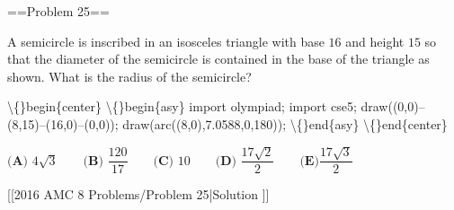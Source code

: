 \documentclass{article}
\begin{document}
\begin{enumerate}[label=\arabic*., itemsep=0.5em]
==Problem 25== 

A semicircle is inscribed in an isosceles triangle with base \(16\) and height \(15\) so that the diameter of the semicircle is contained in the base of the triangle as shown. What is the radius of the semicircle?


\textbackslash\{\}begin\{center\}
\textbackslash\{\}begin\{asy\}
import olympiad;
import cse5;
draw((0,0)--(8,15)--(16,0)--(0,0));
draw(arc((8,0),7.0588,0,180));
\textbackslash\{\}end\{asy\}
\textbackslash\{\}end\{center\}


\(\textbf{(A) }4 \sqrt{3}\qquad\textbf{(B) } \dfrac{120}{17}\qquad\textbf{(C) }10\qquad\textbf{(D) }\dfrac{17\sqrt{2}}{2}\qquad \textbf{(E)} \dfrac{17\sqrt{3}}{2}\)

[[2016 AMC 8 Problems/Problem 25|Solution
]]\par \vspace{0.5em}\end{enumerate}
\end{document}
